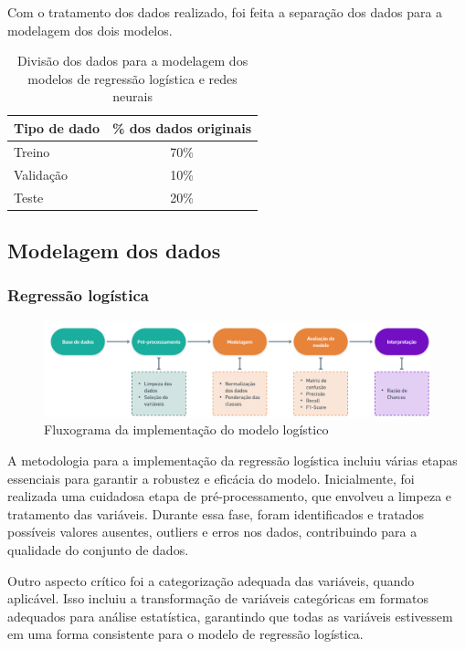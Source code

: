 Com o tratamento dos dados realizado, foi feita a separação dos dados para a modelagem dos dois modelos.


\begin{table}[h]
  \centering
  \begin{tabular}{l|c}
  \hline
  \textbf{Tipo de dado} & \textbf{\% dos dados originais} \\ \hline
  Treino & 70\% \\ 
  Validação & 10\% \\
  Teste & 20\% \\ \hline
  \end{tabular}
  \caption{Divisão dos dados para a modelagem dos modelos de regressão logística e redes neurais}
  \label{table:divisao_dados}
\end{table}



\subsection{Modelagem dos dados}

\subsubsection{Regressão logística}

\begin{figure}[H]
  \centering
  \includegraphics[width=1\textwidth]{imagens/flugrama_logistico.png}
  \caption{Fluxograma da implementação do modelo logístico}
  \label{fig:imagens/flugrama_logistico.png}
\end{figure}

A metodologia para a implementação da regressão logística incluiu várias etapas essenciais para 
garantir a robustez e eficácia do modelo. Inicialmente, foi realizada uma cuidadosa etapa de pré-processamento, 
que envolveu a limpeza e tratamento das variáveis. Durante essa fase, foram identificados e tratados 
possíveis valores ausentes, outliers e erros nos dados, contribuindo para a qualidade do conjunto de dados.

Outro aspecto crítico foi a categorização adequada das variáveis, quando aplicável. Isso incluiu a transformação
de variáveis categóricas em formatos adequados para análise estatística, garantindo que todas as variáveis 
estivessem em uma forma consistente para o modelo de regressão logística.

